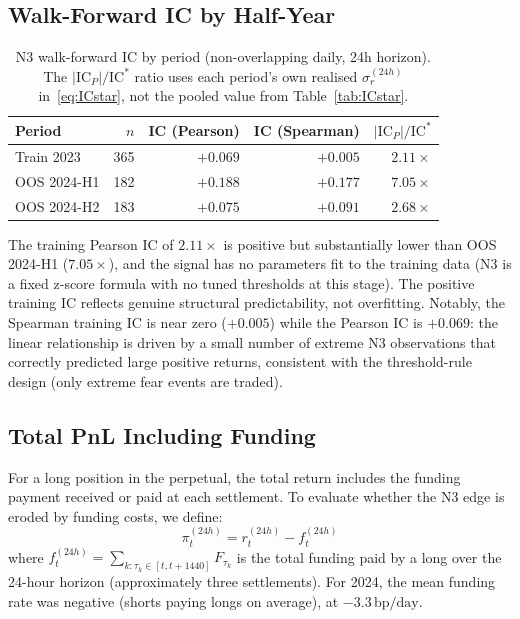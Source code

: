 \documentclass[12pt, a4paper]{article}
\theoremstyle{plain}
\theoremstyle{definition}
\newcommand{\IC}{\mathrm{IC}}
\newcommand{\bp}{\,\mathrm{bp}}
\begin{document}
\subsection{Walk-Forward IC by Half-Year}
\label{sec:walkforward_ic}

\begin{table}[H]
\centering
\caption{N3 walk-forward IC by period (non-overlapping daily, 24h horizon).
  The $|\IC_P|/\IC^*$ ratio uses each period's own realised $\sigma_r^{(24h)}$
  in~\eqref{eq:ICstar}, not the pooled value from Table~\ref{tab:ICstar}.}
\label{tab:wf_2024}
\begin{tabular}{lrrrr}
\toprule
Period & $n$ & IC (Pearson) & IC (Spearman) & $|\IC_P|/\IC^*$ \\
\midrule
Train 2023   & 365 & $+0.069$ & $+0.005$ & $2.11\times$ \\
OOS 2024-H1  & 182 & $+0.188$ & $+0.177$ & $7.05\times$ \\
OOS 2024-H2  & 183 & $+0.075$ & $+0.091$ & $2.68\times$ \\
\bottomrule
\end{tabular}
\end{table}

The training Pearson IC of $2.11\times$ is positive but substantially lower
than OOS 2024-H1 ($7.05\times$), and the signal has no parameters fit
to the training data (N3 is a fixed z-score formula with no tuned thresholds
at this stage). The positive training IC reflects genuine structural
predictability, not overfitting. Notably, the Spearman training IC is near
zero ($+0.005$) while the Pearson IC is $+0.069$: the linear relationship
is driven by a small number of extreme N3 observations that correctly
predicted large positive returns, consistent with the threshold-rule design
(only extreme fear events are traded).

\subsection{Total PnL Including Funding}
\label{sec:totalPnL}

For a long position in the perpetual, the total return includes the funding
payment received or paid at each settlement. To evaluate whether the N3
edge is eroded by funding costs, we define:
\[
  \pi_t^{(24h)} = r_t^{(24h)} - f_t^{(24h)}
\]
where $f_t^{(24h)} = \sum_{k: \tau_k \in [t, t+1440]} F_{\tau_k}$ is the
total funding paid by a long over the 24-hour horizon (approximately three
settlements). For 2024, the mean funding rate was negative (shorts paying
longs on average), at $-3.3\bp/\text{day}$.
\end{document}
